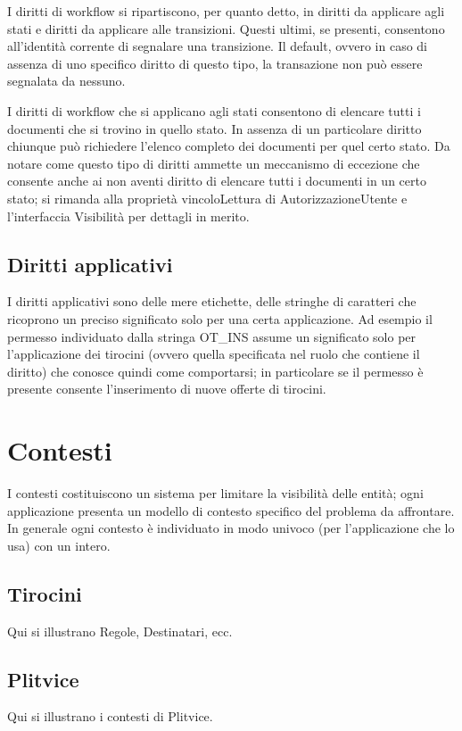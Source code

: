 I diritti di workflow si ripartiscono, per quanto detto, in diritti da applicare agli stati e diritti da applicare alle transizioni. Questi ultimi, se presenti, consentono all'identità corrente di segnalare una transizione. Il default, ovvero in caso di assenza di uno specifico diritto di questo tipo, la transazione non può essere segnalata da nessuno.


I diritti di workflow che si applicano agli stati consentono di elencare tutti i documenti che si trovino in quello stato. In assenza di un particolare diritto chiunque può richiedere l'elenco completo dei documenti per quel certo stato. Da notare come questo tipo di diritti ammette un meccanismo di eccezione che consente anche ai non aventi diritto di elencare tutti i documenti in un certo stato; si rimanda alla proprietà vincoloLettura di AutorizzazioneUtente e l'interfaccia Visibilità per dettagli in merito.

\subsection{Diritti applicativi}

I diritti applicativi sono delle mere etichette, delle stringhe di caratteri che ricoprono un preciso significato solo per una certa applicazione. Ad esempio il permesso individuato dalla stringa OT\_INS assume un significato solo per l'applicazione dei tirocini (ovvero quella specificata nel ruolo che contiene il diritto)  che conosce quindi come comportarsi; in particolare se il permesso è presente consente l'inserimento di nuove offerte di tirocini.

\section{Contesti}
I contesti costituiscono un sistema per limitare la visibilità delle entità; ogni applicazione presenta un modello di contesto specifico del problema da affrontare. In generale ogni contesto è individuato in modo univoco (per l'applicazione che lo usa) con un intero.

\subsection{Tirocini}
Qui si illustrano Regole, Destinatari, ecc.

\subsection{Plitvice}
Qui si illustrano i contesti di Plitvice.

